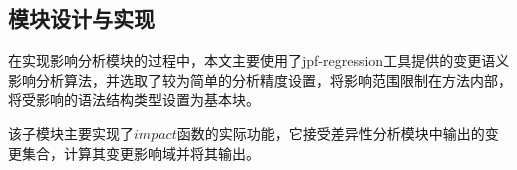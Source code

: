 %


%
%

\subsection{模块设计与实现}

在实现影响分析模块的过程中，本文主要使用了jpf-regression工具提供的变更语义影响分析算法，并选取了较为简单的分析精度设置，将影响范围限制在方法内部，将受影响的语法结构类型设置为基本块。

该子模块主要实现了$impact$函数的实际功能，它接受差异性分析模块中输出的变更集合，计算其变更影响域并将其输出。


